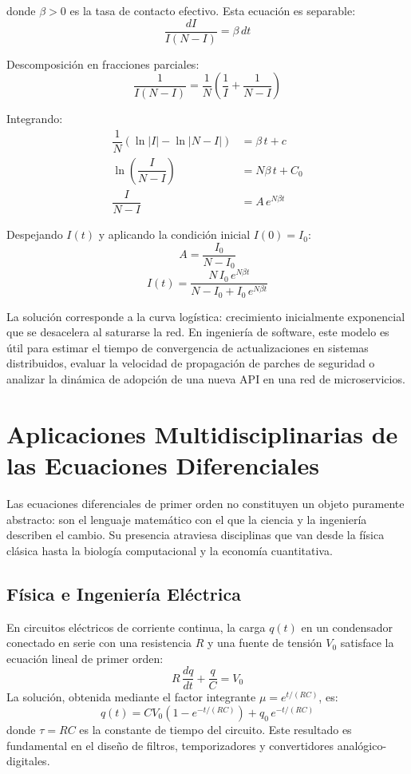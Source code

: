 \documentclass[12pt,letterpaper]{report}
\numberwithin{equation}{chapter}
\numberwithin{figure}{chapter}
\numberwithin{table}{chapter}
\begin{document}
donde $\beta > 0$ es la tasa de contacto efectivo. Esta ecuación es separable:
\[
\dfrac{dI}{I(N - I)} = \beta\,dt
\]

Descomposición en fracciones parciales:
\[
\dfrac{1}{I(N - I)} = \dfrac{1}{N}\!\left(\dfrac{1}{I} + \dfrac{1}{N - I}\right)
\]

Integrando:
\begin{align*}
\dfrac{1}{N}\!\left(\ln|I| - \ln|N - I|\right) &= \beta\,t + c \\[4pt]
\ln\!\left(\dfrac{I}{N - I}\right) &= N\beta\,t + C_0 \\[4pt]
\dfrac{I}{N - I} &= A\,e^{N\beta t}
\end{align*}

Despejando $I(t)$ y aplicando la condición inicial $I(0) = I_0$:
\[
A = \dfrac{I_0}{N - I_0}
\]
\[
\boxed{I(t) = \dfrac{N\,I_0\,e^{N\beta t}}{N - I_0 + I_0\,e^{N\beta t}}}
\]

La solución corresponde a la curva logística: crecimiento inicialmente exponencial que se desacelera al saturarse la red. En ingeniería de software, este modelo es útil para estimar el tiempo de convergencia de actualizaciones en sistemas distribuidos, evaluar la velocidad de propagación de parches de seguridad o analizar la dinámica de adopción de una nueva API en una red de microservicios.

\section{Aplicaciones Multidisciplinarias de las Ecuaciones Diferenciales}

Las ecuaciones diferenciales de primer orden no constituyen un objeto puramente abstracto: son el lenguaje matemático con el que la ciencia y la ingeniería describen el cambio. Su presencia atraviesa disciplinas que van desde la física clásica hasta la biología computacional y la economía cuantitativa.

\subsection{Física e Ingeniería Eléctrica}

En circuitos eléctricos de corriente continua, la carga $q(t)$ en un condensador conectado en serie con una resistencia $R$ y una fuente de tensión $V_0$ satisface la ecuación lineal de primer orden:
\[
 R\,\dfrac{dq}{dt} + \dfrac{q}{C} = V_0
\]
La solución, obtenida mediante el factor integrante $\mu = e^{t/(RC)}$, es:
\[
 q(t) = CV_0\!\left(1 - e^{-t/(RC)}\right) + q_0\,e^{-t/(RC)}
\]
donde $\tau = RC$ es la constante de tiempo del circuito. Este resultado es fundamental en el diseño de filtros, temporizadores y convertidores analógico-digitales.
\end{document}
